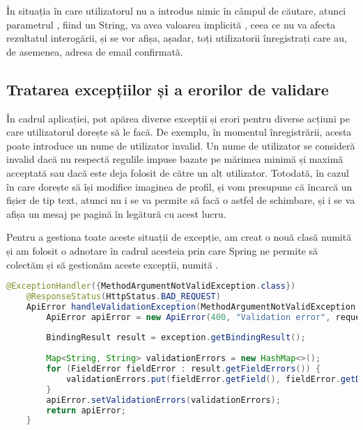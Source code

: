 În situația în care utilizatorul nu a introdus nimic în câmpul de căutare, atunci parametrul , fiind un String, va avea valoarea implicită , ceea ce nu va afecta rezultatul interogării, și se vor afișa, așadar, toți utilizatorii înregistrați care au, de asemenea, adresa de email confirmată.\newline

\subsection{Tratarea excepțiilor și a erorilor de validare}

În cadrul aplicației, pot apărea diverse excepții și erori pentru diverse acțiuni pe care utilizatorul dorește să le facă. De exemplu, în momentul înregistrării, acesta poate introduce un nume de utilizator invalid. Un nume de utilizator se consideră invalid dacă nu respectă regulile impuse bazate pe mărimea minimă și maximă acceptată sau dacă este deja folosit de către un alt utilizator. Totodată, în cazul în care dorește să își modifice imaginea de profil, și vom presupune că încarcă un fișier de tip text, atunci nu i se va permite să facă o astfel de schimbare, și i se va afișa un mesaj pe pagină în legătură cu acest lucru.\newline

Pentru a gestiona toate aceste situații de excepție, am creat o nouă clasă numită  și am folosit o adnotare în cadrul acesteia prin care Spring ne permite să colectăm și să gestionăm aceste excepții, numită .\newline

\begin{lstlisting}[language=Java]
	@ExceptionHandler({MethodArgumentNotValidException.class})
	@ResponseStatus(HttpStatus.BAD_REQUEST)
	ApiError handleValidationException(MethodArgumentNotValidException exception, HttpServletRequest request) {
		ApiError apiError = new ApiError(400, "Validation error", request.getServletPath());
		
		BindingResult result = exception.getBindingResult();
		
		Map<String, String> validationErrors = new HashMap<>();
		for (FieldError fieldError : result.getFieldErrors()) {
			validationErrors.put(fieldError.getField(), fieldError.getDefaultMessage());
		}
		apiError.setValidationErrors(validationErrors);
		return apiError;
	}
\end{lstlisting}
\bigskip

